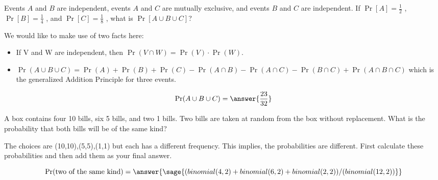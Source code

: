\documentclass{ximera}
\begin{document}
\begin{problem}
Events $A$ and $B$ are independent, events $A$ and $C$ are mutually exclusive, and events $B$ and $C$ are independent. If $\Pr[A]= \frac{1}{2}$ , $\Pr[B]= \frac{1}{4}$ , and $\Pr[C]= \frac{1}{8}$ , what is $\Pr[A \cup B \cup C]$? 
\begin{hint}
We would like to make use of two facts here:
\begin{itemize}
    \item If V and W are independent, then $\Pr(V\cap W)=\Pr(V)\cdot \Pr(W) $.
    \item $\Pr(A\cup B\cup C)=\Pr(A)+\Pr(B)+\Pr(C)-\Pr(A\cap B)-\Pr(A\cap C)-\Pr(B\cap C) +\Pr(A\cap B \cap C)$ which is the generalized Addition Principle for three events.
\end{itemize}
\end{hint}

\begin{prompt}
\begin{equation*}
\Pr(A\cup B \cup C ) = \answer{\frac{23}{32}} 
\end{equation*}

\end{prompt}
\end{problem}


\begin{problem}
A box contains four 10 bills, six 5 bills, and two 1 bills. Two bills are taken at random from the box without replacement. What is the probability that both bills will be of the same kind? 
\begin{hint}
The choices are (10,10),(5,5),(1,1) but each has a different frequency. This implies, the probabilities are different. First calculate these probabilities and then add them as your final answer.
\end{hint}



\begin{prompt}
$$ 
\Pr(\text{two of the same kind}) =\answer{\sage{(binomial(4,2)+binomial(6,2)+binomial(2,2))/(binomial(12,2))}}
$$
\end{prompt}
\end{problem}
\end{document}
